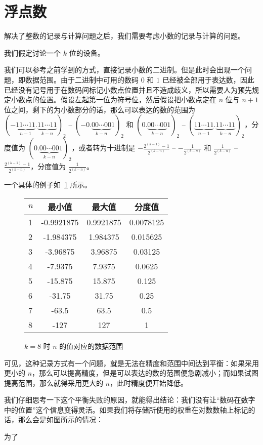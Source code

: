 \section{浮点数}\label{sec:NumberSystemBasics/floating-point}
    解决了整数的记录与计算问题之后，我们需要考虑小数的记录与计算的问题。

    我们假定讨论一个 $k$ 位的设备。

    我们可以参考之前学到的方式，直接记录小数的二进制。但是此时会出现一个问题，即数据范围。由于二进制中可用的数码 $0$ 和 $1$ 已经被全部用于表达数，因此已经没有记号用于在数码间标记小数点位置并且不造成歧义，所以需要人为预先规定小数点的位置。假设左起第一位为符号位，然后假设把小数点定在 $n$ 位与 $n + 1$ 位之间，剩下的为小数部分的话，那么可以表达的数的范围为 $(-\underbrace{11 \cdots 11}_{n-1}.\underbrace{11 \cdots 11}_{k-n})_2$ -- $(-0.\underbrace{00 \cdots 00}_{k-n}1)_2$ 和 $(0.\underbrace{00 \cdots 00}_{k-n}1)_2$ -- $(\underbrace{11 \cdots 11}_{n-1}.\underbrace{11 \cdots 11}_{k-n})_2$，分度值为 $(0.\underbrace{00 \cdots 00}_{k-n}1)_2$，或者转为十进制是 $-\frac{2^{(k-1)}-1}{2^{(k-n)}}$ -- $-\frac{1}{2^{(k-n)}}$ 和 $\frac{1}{2^{(k-n)}}$ -- $\frac{2^{(k-1)}-1}{2^{(k-n)}}$，分度值为 $\frac{1}{2^{(k-n)}}$。

    一个具体的例子如~\ref{fig:NumberSystemBasics/floating-point/data-range} 所示。

    \begin{figure}
        \centering
        \begin{tabular}{lS[table-format=-3.7]S[table-format=-3.7]S[table-format=-3.7]}
            $n$ & 最小值     & 最大值    & 分度值    \\    & -0.9921875 & 0.9921875  & 0.0078125 \\
            2   & -1.984375  & 1.984375   & 0.015625  \\
            3   & -3.96875   & 3.96875    & 0.03125   \\
            4   & -7.9375    & 7.9375     & 0.0625    \\
            5   & -15.875    & 15.875     & 0.125     \\
            6   & -31.75     & 31.75      & 0.25      \\
            7   & -63.5      & 63.5       & 0.5       \\
            8   & -127       & 127        & 1         \\
        \end{tabular}
        \caption{$k = 8$ 时 $n$ 的值对应的数据范围}
        \label{fig:NumberSystemBasics/floating-point/data-range}
    \end{figure}

    可见，这种记录方式有一个问题，就是无法在精度和范围中间达到平衡：如果采用更小的 $n$，那么可以提高精度，但是可以表达的数的范围便急剧减小；而如果试图提高范围，那么就得采用更大的 $n$，此时精度便开始降低。

    我们仔细思考一下这个平衡失败的原因，就能得出结论：我们没有让“数码在数字中的位置”这个信息变得灵活。如果我们将存储所使用的权重在对数数轴上标记的话，那么会是如图所示的情况：


    为了
